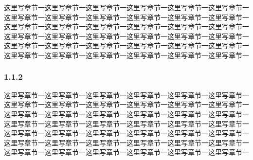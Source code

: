 \documentclass[UTF8,12pt,a4paper]{ctexart}
\begin{document}
这里写章节一这里写章节一这里写章节一这里写章节一这里写章节一这里写章节一这里写章节一这里写章节一这里写章节一这里写章节一这里写章节一这里写章节一这里写章节一这里写章节一这里写章节一这里写章节一这里写章节一这里写章节一这里写章节一这里写章节一这里写章节一这里写章节一这里写章节一这里写章节一这里写章节一这里写章节一这里写章节一这里写章节一这里写章节一这里写章节一这里写章节一这里写章节一这里写章节一这里写章节一这里写章节一这里写章节一

\subsubsection{1.1.2}
这里写章节一这里写章节一这里写章节一这里写章节一这里写章节一这里写章节一这里写章节一这里写章节一这里写章节一这里写章节一这里写章节一这里写章节一这里写章节一这里写章节一这里写章节一这里写章节一这里写章节一这里写章节一这里写章节一这里写章节一这里写章节一这里写章节一这里写章节一这里写章节一这里写章节一这里写章节一这里写章节一这里写章节一这里写章节一这里写章节一这里写章节一这里写章节一这里写章节一这里写章节一这里写章节一这里写章节一这里写章节一这里写章节一这里写章节一这里写章节一这里写章节一这里写章节一
\end{document}
